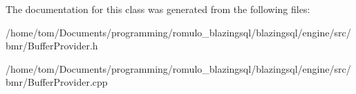 The documentation for this class was generated from the following files\+:\begin{DoxyCompactItemize}
\item 
/home/tom/\+Documents/programming/romulo\+\_\+blazingsql/blazingsql/engine/src/bmr/Buffer\+Provider.\+h\item 
/home/tom/\+Documents/programming/romulo\+\_\+blazingsql/blazingsql/engine/src/bmr/Buffer\+Provider.\+cpp\end{DoxyCompactItemize}
